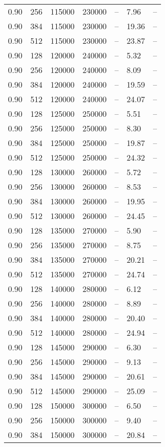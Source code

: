 \begin{tabular}{l|l|l|l|l|l|l}
0.90 & 256 & 115000 & 230000 & -- &  7.96 & --\\
0.90 & 384 & 115000 & 230000 & -- & 19.36 & --\\
0.90 & 512 & 115000 & 230000 & -- & 23.87 & --\\
0.90 & 128 & 120000 & 240000 & -- &  5.32 & --\\
0.90 & 256 & 120000 & 240000 & -- &  8.09 & --\\
0.90 & 384 & 120000 & 240000 & -- & 19.59 & --\\
0.90 & 512 & 120000 & 240000 & -- & 24.07 & --\\
0.90 & 128 & 125000 & 250000 & -- &  5.51 & --\\
0.90 & 256 & 125000 & 250000 & -- &  8.30 & --\\
0.90 & 384 & 125000 & 250000 & -- & 19.87 & --\\
0.90 & 512 & 125000 & 250000 & -- & 24.32 & --\\
0.90 & 128 & 130000 & 260000 & -- &  5.72 & --\\
0.90 & 256 & 130000 & 260000 & -- &  8.53 & --\\
0.90 & 384 & 130000 & 260000 & -- & 19.95 & --\\
0.90 & 512 & 130000 & 260000 & -- & 24.45 & --\\
0.90 & 128 & 135000 & 270000 & -- &  5.90 & --\\
0.90 & 256 & 135000 & 270000 & -- &  8.75 & --\\
0.90 & 384 & 135000 & 270000 & -- & 20.21 & --\\
0.90 & 512 & 135000 & 270000 & -- & 24.74 & --\\
0.90 & 128 & 140000 & 280000 & -- &  6.12 & --\\
0.90 & 256 & 140000 & 280000 & -- &  8.89 & --\\
0.90 & 384 & 140000 & 280000 & -- & 20.40 & --\\
0.90 & 512 & 140000 & 280000 & -- & 24.94 & --\\
0.90 & 128 & 145000 & 290000 & -- &  6.30 & --\\
0.90 & 256 & 145000 & 290000 & -- &  9.13 & --\\
0.90 & 384 & 145000 & 290000 & -- & 20.61 & --\\
0.90 & 512 & 145000 & 290000 & -- & 25.09 & --\\
0.90 & 128 & 150000 & 300000 & -- &  6.50 & --\\
0.90 & 256 & 150000 & 300000 & -- &  9.40 & --\\
0.90 & 384 & 150000 & 300000 & -- & 20.84 & --\\

\end{tabular}
